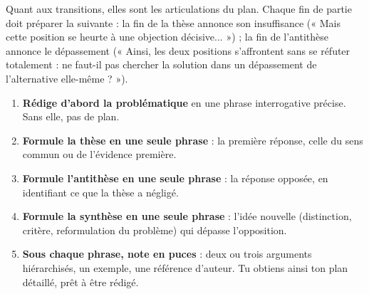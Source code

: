 \documentclass[11pt]{article}
\begin{document}
Quant aux transitions, elles sont les articulations du plan. Chaque fin de partie doit préparer la suivante : la fin de la thèse annonce son insuffisance (« Mais cette position se heurte à une objection décisive... ») ; la fin de l'antithèse annonce le dépassement (« Ainsi, les deux positions s'affrontent sans se réfuter totalement : ne faut-il pas chercher la solution dans un dépassement de l'alternative elle-même ? »).

\begin{methode}
\begin{enumerate}
\item \textbf{Rédige d'abord la problématique} en une phrase interrogative précise. Sans elle, pas de plan.
\item \textbf{Formule la thèse en une seule phrase} : la première réponse, celle du sens commun ou de l'évidence première.
\item \textbf{Formule l'antithèse en une seule phrase} : la réponse opposée, en identifiant ce que la thèse a négligé.
\item \textbf{Formule la synthèse en une seule phrase} : l'idée nouvelle (distinction, critère, reformulation du problème) qui dépasse l'opposition.
\item \textbf{Sous chaque phrase, note en puces} : deux ou trois arguments hiérarchisés, un exemple, une référence d'auteur. Tu obtiens ainsi ton plan détaillé, prêt à être rédigé.
\end{enumerate}
\end{methode}
\end{document}
